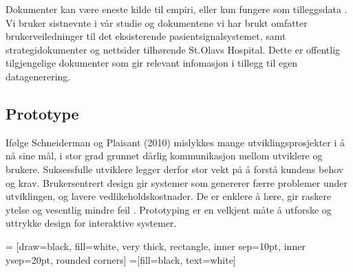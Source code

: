 \noindent
Dokumenter kan være eneste kilde til empiri, eller kun fungere som tilleggsdata \cite{Tjora}. Vi bruker sistnevnte i vår studie og dokumentene vi har brukt omfatter brukerveiledninger til det eksisterende pasientsignalsystemet, samt strategidokumenter og nettsider tilhørende St.Olavs Hospital. Dette er offentlig tilgjengelige dokumenter som gir relevant infomasjon i tillegg til egen datagenerering.


\subsection{Prototype}
Ifølge Schneiderman og Plaisant (2010) mislykkes mange utviklingsprosjekter i å nå sine mål, i stor grad grunnet dårlig kommunikasjon mellom utviklere og brukere. Suksessfulle utviklere legger derfor stor vekt på å forstå kundens behov og krav. 
Brukersentrert design gir systemer som genererer færre problemer under utviklingen, og lavere vedlikeholdskostnader. De er enklere å lære, gir raskere ytelse og vesentlig mindre feil \cite{mmi}.
Prototyping er en velkjent måte å utforske og uttrykke design for interaktive systemer. 

 = [draw=black, fill=white, very thick,
    rectangle, inner sep=10pt, inner ysep=20pt, rounded corners]
 =[fill=black, text=white]
%


